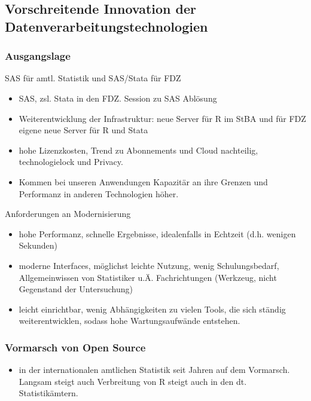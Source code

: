 \documentclass[
  german,
  10pt,
  twoside]{article}
\providecommand{\tightlist}{%
  \setlength{\itemsep}{0pt}\setlength{\parskip}{0pt}}
\begin{document}
\subsection{Vorschreitende Innovation der
Datenverarbeitungstechnologien}\label{vorschreitende-innovation-der-datenverarbeitungstechnologien}

\subsubsection{Ausgangslage}\label{ausgangslage}

SAS für amtl. Statistik und SAS/Stata für FDZ

\begin{itemize}
\tightlist
\item
  SAS, zsl. Stata in den FDZ. Session zu SAS Ablösung
\item
  Weiterentwicklung der Infrastruktur: neue Server für R im StBA und für
  FDZ eigene neue Server für R und Stata
\item
  hohe Lizenzkosten, Trend zu Abonnements und Cloud nachteilig,
  technologielock und Privacy.
\item
  Kommen bei unseren Anwendungen Kapazitär an ihre Grenzen und
  Performanz in anderen Technologien höher.
\end{itemize}

Anforderungen an Modernisierung

\begin{itemize}
\tightlist
\item
  hohe Performanz, schnelle Ergebnisse, idealenfalls in Echtzeit (d.h.
  wenigen Sekunden)
\item
  moderne Interfaces, möglichst leichte Nutzung, wenig Schulungsbedarf,
  Allgemeinwissen von Statistiker u.Ä. Fachrichtungen (Werkzeug, nicht
  Gegenstand der Untersuchung)
\item
  leicht einrichtbar, wenig Abhängigkeiten zu vielen Tools, die sich
  ständig weiterentwicklen, sodass hohe Wartungsaufwände entstehen.
\end{itemize}

\subsubsection{Vormarsch von Open
Source}\label{vormarsch-von-open-source}

\begin{itemize}
\tightlist
\item
  in der internationalen amtlichen Statistik seit Jahren auf dem
  Vormarsch. Langsam steigt auch Verbreitung von R steigt auch in den
  dt. Statistikämtern.
\end{itemize}
\end{document}
